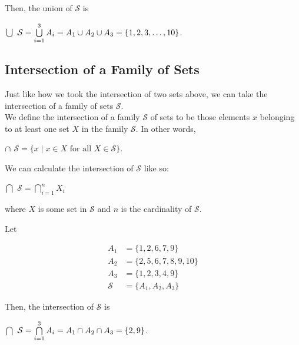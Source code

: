 Then, the union of $\mathcal{S}$ is 

\begin{center}
    $\bigcup$ $\mathcal{S} = \bigcup\limits_{i=1}^{3} A_i = A_1 \cup A_2 \cup A_3 = \{1, 2, 3, \dots, 10\}$. 
\end{center}

\subsection*{Intersection of a Family of Sets}

Just like how we took the intersection of two sets above, we can take the intersection of a family of sets $\mathcal{S}$.\\

We define the intersection of a family $\mathcal{S}$ of sets to be those elements $x$ belonging to at least one set $X$ in the family $\mathcal{S}$.  In other words,

\begin{center}
    $\cap$ $\mathcal{S} = \{x \mid x \in X \text{ for all } X \in \mathcal{S}\}$.
\end{center}

We can calculate the intersection of $\mathcal{S}$ like so:

\begin{center}
    $\bigcap$ $\mathcal{S} = \bigcap\limits_{i=1}^{n} X_i$
\end{center}
\begin{center}
where $X$ is some set in $\mathcal{S}$ and $n$ is the cardinality of $\mathcal{S}$.
\end{center}

Let

\begin{align*}
    A_1 &= \{1, 2, 6, 7, 9\}\\
    A_2 &= \{2, 5, 6, 7, 8, 9, 10\}\\
    A_3 &= \{1, 2, 3, 4, 9\}\\
    \mathcal{S} &= \{A_1, A_2, A_3\}
\end{align*}

Then, the intersection of $\mathcal{S}$ is 

\begin{center}
    $\bigcap$ $\mathcal{S} = \bigcap\limits_{i=1}^{3} A_i = A_1 \cap A_2 \cap A_3 = \{2, 9\}$. 
\end{center}

